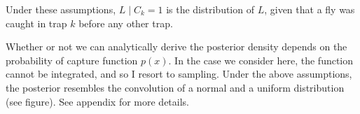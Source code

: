 \documentclass[
]{book}
\begin{document}
Under these assumptions, \(L \mid C_k = 1\) is the distribution of \(L\), given that a fly was caught in trap \(k\) before any other trap.

Whether or not we can analytically derive the posterior density depends on the probability of capture function \(p(x)\). In the case we consider here, the function cannot be integrated, and so I resort to sampling. Under the above assumptions, the posterior resembles the convolution of a normal and a uniform distribution (see figure). See appendix for more details.

  
\end{document}
